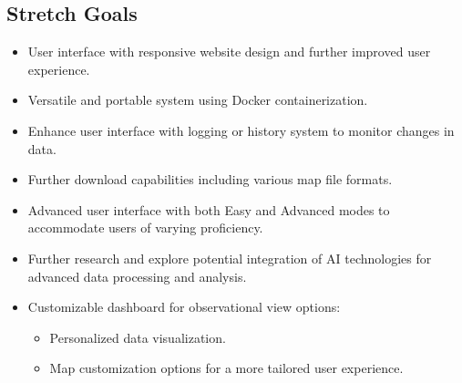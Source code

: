 \documentclass[12pt]{article}
\begin{document}
\subsection*{Stretch Goals}
\begin{itemize}
    \item  User interface with responsive website design and further improved user experience. 
    \item Versatile and portable system using Docker containerization.
    \item Enhance user interface with logging or history system to monitor changes in data.
    \item Further download capabilities including various map file formats.
    \item Advanced user interface with both Easy and Advanced modes to accommodate users of varying proficiency.
    \item Further research and explore potential integration of AI technologies for advanced data processing and analysis.
    \item Customizable dashboard for observational view options:
        \begin{itemize}
            \item Personalized data visualization.
            \item Map customization options for a more tailored user experience.
        \end{itemize}
\end{itemize}
\end{document}
